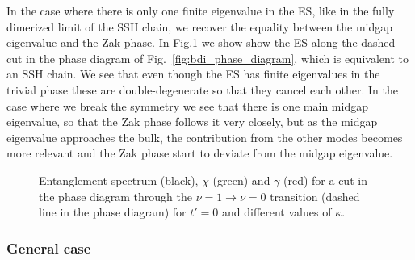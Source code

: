 \documentclass[twocolumn,amsmath,longbibliography,amssymb,superscriptaddress]{revtex4-1}
\begin{document}
In the case where there is only one finite eigenvalue in  the ES, like in the fully dimerized limit of the SSH chain, we recover the equality between the midgap eigenvalue and the Zak phase. In Fig.\ref{huang} we show show the ES along the dashed cut in the phase diagram of Fig.~\ref{fig:bdi_phase_diagram}, which is equivalent to an SSH chain. We see that even though the ES has finite eigenvalues in the trivial phase these are double-degenerate so that they cancel each other. In the case where we break the symmetry we see that there is one main midgap eigenvalue, so that the Zak phase follows it very closely, but as the midgap eigenvalue approaches the bulk, the contribution from the other modes becomes more relevant and the Zak phase start to deviate from the midgap eigenvalue.
\begin{figure}[h!]
\centering
{}
\caption{Entanglement spectrum (black), $\chi$ (green) and $\gamma$ (red) for a cut in the phase diagram through the $\nu = 1 \rightarrow \nu = 0$ transition (dashed line in the phase diagram) for $t'=0$ and different values of $\kappa$.}
\label{huang}
\end{figure}

\subsubsection{General case}
\end{document}
